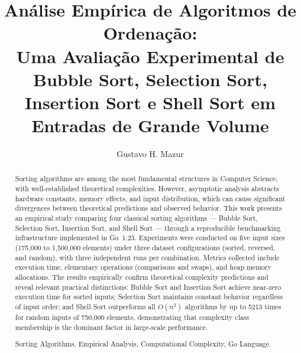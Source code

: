 \documentclass[12pt]{article}
\title{Análise Empírica de Algoritmos de Ordenação:\\
       Uma Avaliação Experimental de Bubble Sort, Selection Sort,\\
       Insertion Sort e Shell Sort em Entradas de Grande Volume}
\author{Gustavo H. Mazur\inst{1}}
\newcommand{\num}[1]{#1}
\begin{document}
\maketitle

\begin{abstract}
Sorting algorithms are among the most fundamental structures in
Computer Science, with well-established theoretical complexities.
However, asymptotic analysis abstracts hardware constants, memory
effects, and input distribution, which can cause significant
divergences between theoretical predictions and observed behavior.
This work presents an empirical study comparing four classical
sorting algorithms — Bubble Sort, Selection Sort, Insertion Sort,
and Shell Sort — through a reproducible benchmarking infrastructure
implemented in Go~1.23. Experiments were conducted on five input
sizes (175,000 to 1,500,000 elements) under three dataset
configurations (sorted, reversed, and random), with three
independent runs per combination. Metrics collected include
execution time, elementary operations (comparisons and swaps),
and heap memory allocations. The results empirically confirm
theoretical complexity predictions and reveal relevant practical
distinctions: Bubble Sort and Insertion Sort achieve near-zero
execution time for sorted inputs; Selection Sort maintains
constant behavior regardless of input order; and Shell Sort
outperforms all $O(n^2)$ algorithms by up to \num{5213} times
for random inputs of 750,000 elements, demonstrating that
complexity class membership is the dominant factor in
large-scale performance.

 Sorting Algorithms, Empirical Analysis, Computational Complexity, Go Language.
\end{abstract}
\end{document}
